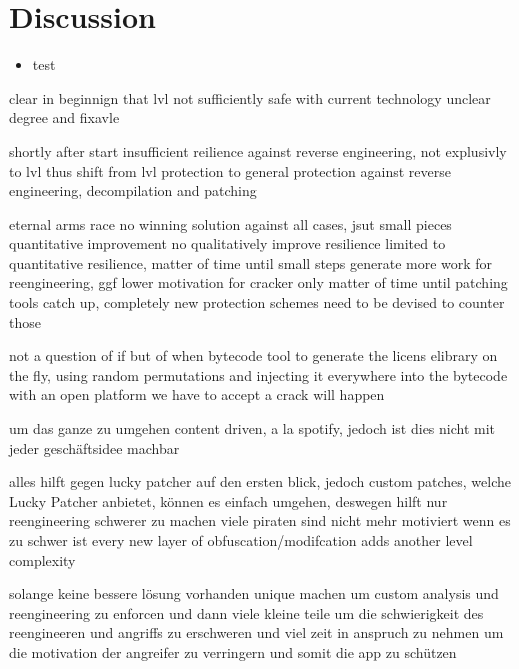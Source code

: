 \section{Discussion} \label{section:conclusion-discussion}
\begin{itemize}
    \item test
\end{itemize}
clear in beginnign that lvl not sufficiently safe with current technology
unclear degree and fixavle

shortly after start insufficient reilience against reverse engineering, not explusivly to lvl
thus shift from lvl protection to general protection against reverse engineering, decompilation and patching

eternal arms race
no winning solution against all cases, jsut small pieces quantitative improvement
no qualitatively improve resilience
limited to quantitative resilience, matter of time until small steps
generate more work for reengineering, ggf lower motivation for cracker
only matter of time until patching tools catch up, completely new protection schemes need to be devised to counter those
\cite{munteanLicense}
%

%
not a question of if but of when
bytecode tool to generate the licens elibrary on the fly, using random  permutations and injecting it everywhere into the bytecode
with an open platform we have to accept a crack will happen
\cite{digipomLvl}
%


um das ganze zu umgehen content driven, a la spotify, jedoch ist dies nicht mit jeder geschäftsidee machbar

alles hilft gegen lucky patcher auf den ersten blick, jedoch custom patches, welche Lucky Patcher anbietet\cite{munteanLicense}, können es einfach umgehen,
deswegen hilft nur reengineering schwerer zu machen
viele piraten sind nicht mehr motiviert wenn es zu schwer ist\newline
every new layer of obfuscation/modifcation adds another level complexity\newline

solange keine bessere lösung vorhanden unique machen um custom analysis und reengineering zu enforcen und dann
viele kleine teile um die schwierigkeit des reengineeren und angriffs zu erschweren und viel zeit in anspruch zu nehmen um die motivation der angreifer zu verringern und somit die app zu schützen
